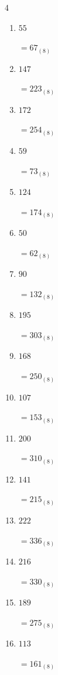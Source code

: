 \begin{multicols}{4}
\begin{enumerate}
\columnbreak %

  \item $55$

        $=67_{(8)}$

  \item $147$

        $=223_{(8)}$

  \item $172$

        $=254_{(8)}$

  \item $59$

        $=73_{(8)}$

  \item $124$

        $=174_{(8)}$

  \item $50$

        $=62_{(8)}$

  \item $90$

        $=132_{(8)}$

  \item $195$

        $=303_{(8)}$

  \item $168$

        $=250_{(8)}$

  \item $107$

        $=153_{(8)}$

  \item $200$

        $=310_{(8)}$

  \item $141$

        $=215_{(8)}$

  \item $222$

        $=336_{(8)}$

  \item $216$

        $=330_{(8)}$

  \item $189$

        $=275_{(8)}$

\columnbreak %

  \item $113$

        $=161_{(8)}$


\end{enumerate}
\end{multicols}
